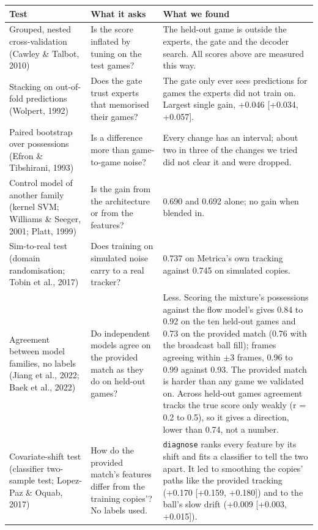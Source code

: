 \documentclass[10pt,a4paper]{article}
\begin{document}
{\footnotesize
\begin{longtable}{>{\raggedright\arraybackslash}p{}>{\raggedright\arraybackslash}p{}>{\raggedright\arraybackslash}p{}}
\toprule
{}\textbf{Test} & {}\textbf{What it asks} & {}\textbf{What we found} \\
\midrule
\endhead
{}Grouped, nested cross-validation (Cawley \& Talbot, 2010) & {}Is the score inflated by tuning on the test games? & {}The held-out game is outside the experts, the gate and the decoder search. All scores above are measured this way. \\
\addlinespace[3pt]
{}Stacking on out-of-fold predictions (Wolpert, 1992) & {}Does the gate trust experts that memorised their games? & {}The gate only ever sees predictions for games the experts did not train on. Largest single gain, +0.046 [+0.034, +0.057]. \\
\addlinespace[3pt]
{}Paired bootstrap over possessions (Efron \& Tibshirani, 1993) & {}Is a difference more than game-to-game noise? & {}Every change has an interval; about two in three of the changes we tried did not clear it and were dropped. \\
\addlinespace[3pt]
{}Control model of another family (kernel SVM; Williams \& Seeger, 2001; Platt, 1999) & {}Is the gain from the architecture or from the features? & {}0.690 and 0.692 alone; no gain when blended in. \\
\addlinespace[3pt]
{}Sim-to-real test (domain randomisation; Tobin et al., 2017) & {}Does training on simulated noise carry to a real tracker? & {}0.737 on Metrica's own tracking against 0.745 on simulated copies. \\
\addlinespace[3pt]
{}Agreement between model families, no labels (Jiang et al., 2022; Baek et al., 2022) & {}Do independent models agree on the provided match as they do on held-out games? & {}Less. Scoring the mixture's possessions against the flow model's gives 0.84 to 0.92 on the ten held-out games and 0.73 on the provided match (0.76 with the broadcast ball fill); frames agreeing within \ensuremath{\pm}3 frames, 0.96 to 0.99 against 0.93. The provided match is harder than any game we validated on. Across held-out games agreement tracks the true score only weakly (r = 0.2 to 0.5), so it gives a direction, lower than 0.74, not a number. \\
\addlinespace[3pt]
{}Covariate-shift test (classifier two-sample test; Lopez-Paz \& Oquab, 2017) & {}How do the provided match's features differ from the training copies'? No labels used. & {}\texttt{diagnose} ranks every feature by its shift and fits a classifier to tell the two apart. It led to smoothing the copies' paths like the provided tracking (+0.170 [+0.159, +0.180]) and to the ball's slow drift (+0.009 [+0.003, +0.015]). \\

\end{longtable}}
\end{document}
